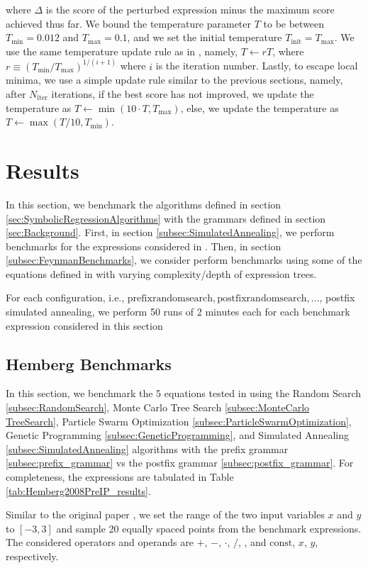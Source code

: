 \documentclass[12pt]{iopart}
\newcommand\specialcaret{%
  \stackengine{0pt}{\ \,}{\scalebox{1.1}[2]{\raisebox{-0.9ex}{\string^}}}{O}{c}{F}{T}{L}}
\begin{document}
where $\Delta$ is the score of the perturbed expression minus the maximum score achieved thus far. We bound the temperature parameter $T$ to be between $T_{\mathrm{min}} = 0.012$ and $T_{\mathrm{max}} = 0.1$, and we set the initial temperature $T_{\mathrm{init}} = T_{\mathrm{max}}$. We use the same temperature update rule as in \cite{10.1145/3449639.3459345}, namely, $T \gets rT$, where $r \equiv \left(T_{\mathrm{min}}/T_{\mathrm{max}}\right)^{1/(i+1)}$ where $i$ is the iteration number. Lastly, to escape local minima, we use a simple update rule similar to the previous sections, namely, after $N_{\mathrm{iter}}$ iterations, if the best score has not improved, we update the temperature as $T \gets \min{\left(10\cdot T, T_{\mathrm{max}}\right)}$, else, we update the temperature as $T \gets \max{\left(T/10, T_{\mathrm{min}}\right)}$.

\section{Results}\label{sec:Results}
In this section, we benchmark the algorithms defined in section \ref{sec:SymbolicRegressionAlgorithms} with the grammars defined in section \ref{sec:Background}. First, in section \ref{subsec:SimulatedAnnealing}, we perform benchmarks for the expressions considered in \cite{hemberg2008pre}. Then, in section \ref{subsec:FeynmanBenchmarks}, we consider perform benchmarks using some of the equations defined in \cite{udrescu2020ai} with varying complexity/depth of expression trees.
\par For each configuration, i.e., $\mathrm{prefix random search, postfix random search, } \ldots$, postfix simulated annealing, we perform 50 runs of 2 minutes each for each benchmark expression considered in this section
\subsection{Hemberg Benchmarks} \label{subsec:HembergBenchmarks}
In this section, we benchmark the 5 equations tested in \cite{hemberg2008pre} using the Random Search \ref{subsec:RandomSearch}, Monte Carlo Tree Search \ref{subsec:MonteCarlo TreeSearch}, Particle Swarm Optimization \ref{subsec:ParticleSwarmOptimization}, Genetic Programming \ref{subsec:GeneticProgramming}, and Simulated Annealing \ref{subsec:SimulatedAnnealing} algorithms with the prefix grammar \ref{subsec:prefix_grammar} vs the postfix grammar \ref{subsec:postfix_grammar}. For completeness, the expressions are tabulated in Table \ref{tab:Hemberg2008PreIP_results}.
\par Similar to the original paper \cite{hemberg2008pre}, we set the range of the two input variables $x$ and $y$ to $[-3,3]$ and sample 20 equally spaced points from the benchmark expressions.  The considered operators and operands are $+$, $-$, $\cdot$, $/$, \specialcaret , and $\mathrm{const}$, $x$, $y$, respectively. 
\end{document}
